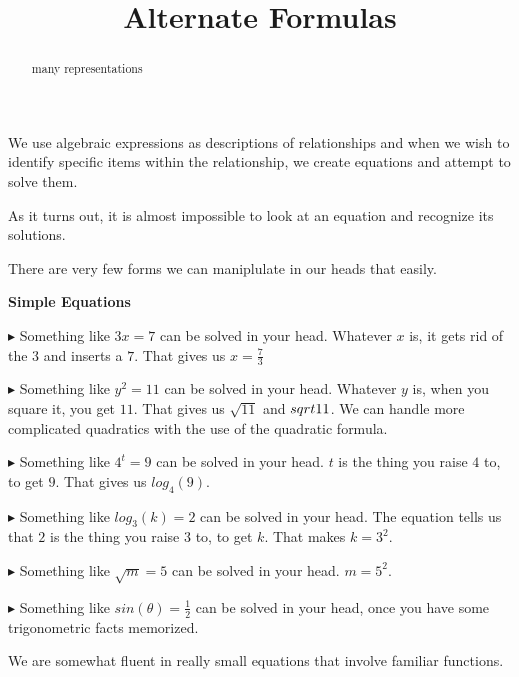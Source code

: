 \documentclass{ximera}
\title{Alternate Formulas}
\begin{document}
\begin{abstract}
many representations
\end{abstract}
\maketitle





We use algebraic expressions as descriptions of relationships and when we wish to identify specific items within the relationship, we create equations and attempt to solve them.

As it turns out, it is almost impossible to look at an equation and recognize its solutions.


There are very few forms we can maniplulate in our heads that easily.



\textbf{Simple Equations}

$\blacktriangleright$ Something like $3x = 7$ can be solved in your head.  Whatever $x$ is, it gets rid of the $3$ and inserts a $7$.  That gives us $x =\frac{7}{3}$





$\blacktriangleright$ Something like $y^2 = 11$ can be solved in your head.  Whatever $y$ is, when you square it, you get $11$.  That gives us $\sqrt{11}$ and $\-sqrt{11}$.  We can handle more complicated  quadratics with the use of the quadratic formula.




$\blacktriangleright$ Something like $4^t = 9$ can be solved in your head.  $t$ is the thing you raise $4$ to, to get $9$.  That gives us $log_4(9)$.



$\blacktriangleright$ Something like $log_3(k) = 2$ can be solved in your head.  The equation tells us that $2$ is the thing you raise $3$ to, to get $k$.  That makes $k = 3^2$.



$\blacktriangleright$ Something like $\sqrt{m} = 5$ can be solved in your head.  $m = 5^2$.


$\blacktriangleright$ Something like $sin(\theta) = \frac{1}{2}$ can be solved in your head, once you have some trigonometric facts memorized.



We are somewhat fluent in really small equations that involve familiar functions.  
\end{document}
